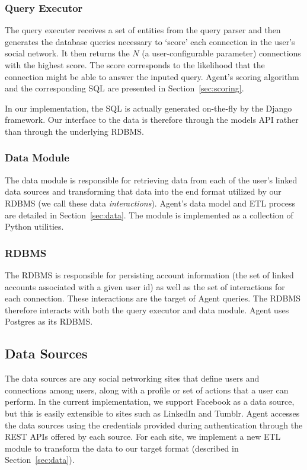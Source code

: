 \subsubsection{Query Executor}
The query executer receives a set of entities from the query parser and then
generates the database queries necessary to `score' each connection in the
user's social network.  It then returns the $N$ (a user-configurable parameter)
connections with the highest score.  The score corresponds to the likelihood
that the connection might be able to answer the inputed query. Agent's scoring
algorithm and the corresponding SQL are presented in Section~\ref{sec:scoring}.

In our implementation, the SQL is actually generated on-the-fly by the Django
framework. Our interface to the data is therefore through the models API rather
than through the underlying RDBMS.

\subsubsection{Data Module}
The data module is responsible for retrieving data from each of the user's
linked data sources and transforming that data into the end format utilized by
our RDBMS (we call these data {\it interactions}). Agent's data model and ETL
process are detailed in Section~\ref{sec:data}. The module is implemented as a
collection of Python utilities.

\subsubsection{RDBMS}
The RDBMS is responsible for persisting account information (the set of linked
accounts associated with a given user id) as well as the set of interactions for
each connection. These interactions are the target of Agent queries. The RDBMS
therefore interacts with both the query executor and data module. Agent uses
Postgres as its RDBMS.

\subsection{Data Sources}
The data sources are any social networking sites that define users and
connections among users, along with a profile or set of actions that a user can
perform. In the current implementation, we support Facebook as a data source,
but this is easily extensible to sites such as LinkedIn and Tumblr. Agent
accesses the data sources using the credentials provided during authentication
through the REST APIs offered by each source. For each site, we implement a new
ETL module to transform the data to our target format (described in
Section~\ref{sec:data}).
